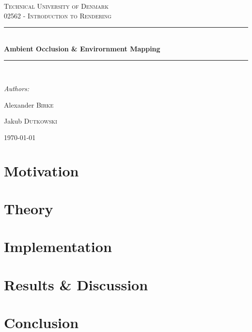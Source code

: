 \documentclass[12pt, twoside,a4paper]{report}
\newcommand{\HRule}{\rule{\linewidth}{0.5mm}}
\begin{document}






\begin{titlepage}
\begin{center}

\textsc{\LARGE Technical University of Denmark}\\[1.5cm]

\textsc{\Large 02562 - Introduction to Rendering}\\[0.5cm]
\HRule \\[0.4cm]
{ \huge \bfseries Ambient Occlusion \& Envirornment Mapping}\\[0.4cm]
\HRule \\[1.5cm]
\begin{center}
\emph{Authors:}\\
\end{center}
\begin{minipage}{0.4\textwidth}
\begin{flushleft} \large
Alexander \textsc{Birke}
\end{flushleft}
\end{minipage}
\begin{minipage}{0.4\textwidth}
\begin{flushright} \large
Jakub \textsc{Dutkowski}
\end{flushright}
\end{minipage}

\vfill

{\large \today}

\end{center}

\end{titlepage}

\tableofcontents
\chapter{Motivation}


\chapter{Theory}


\chapter{Implementation}


\chapter{Results \& Discussion}


\chapter{Conclusion}



%

\end{document}
